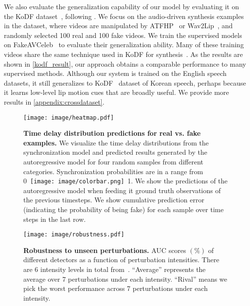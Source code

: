 \documentclass[10pt,twocolumn,letterpaper]{article}
\def\upvspacefig{\vspace{-0.0mm}}
\newcommand{\supparxiv}[2]{#2}
\begin{document}
We also evaluate the generalization capability of our model by evaluating it on the KoDF dataset~\cite{kwon2021kodf}, following \cite{haliassos2022leveraging, haliassos2021lips, zheng2021exploring, zhou2021joint}. We focus on the audio-driven synthesis examples in the dataset, where videos are manipulated by ATFHP~\cite{yi2020audio} or Wav2Lip~\cite{prajwal2020lip}, and randomly selected 100 real and 100 fake videos. We train the supervised models on FakeAVCeleb~\cite{NEURIPS_DATASETS_AND_BENCHMARKS2021_d9d4f495} to evaluate their generalization ability. Many of these training videos share the same technique used in KoDF for synthesis~\cite{prajwal2020lip}. As the results are shown in \cref{kodf_result}, our approach obtains a comparable performance to many supervised methods. Although our system is trained on the English speech datasets, it still generalizes to KoDF~\cite{kwon2021kodf} dataset of Korean speech, perhaps because it learns low-level lip motion cues that are broadly useful. We provide more results in \supparxiv{the supplement}{\cref{appendix:crossdataset}}.






\begin{figure}[t!]
    \centering
    \upvspacefig
    \texttt{[image: image/heatmap.pdf]}
    \caption{\textbf{Time delay distribution predictions for real vs. fake examples.} We visualize the time delay distributions from the synchronization model and predicted results generated by the autoregressive model for four random samples from different categories. Synchronization probabilities are in a range from 0~\texttt{[image: image/colorbar.png]}~1. We show the predictions of the autoregressive model when feeding it ground truth observations of the previous timesteps. We show cumulative prediction error (indicating the probability of being fake) for each sample over time steps in the last row. } \label{heatmap}
\end{figure} 
\begin{figure*}[t!]
    \centering
    \upvspacefig
 \texttt{[image: image/robustness.pdf]}
    \caption{\textbf{Robustness to unseen perturbations.} AUC scores $(\%)$ of different detectors as a function of perturbation intensities. There are 6 intensity levels in total from~\cite{jiang2020deeperforensics}. ``Average'' represents the average over 7 perturbations under each intensity. ``Rival'' means we pick the worst performance across 7 perturbations under each intensity.}
    \label{robustness}
\end{figure*}
\end{document}
